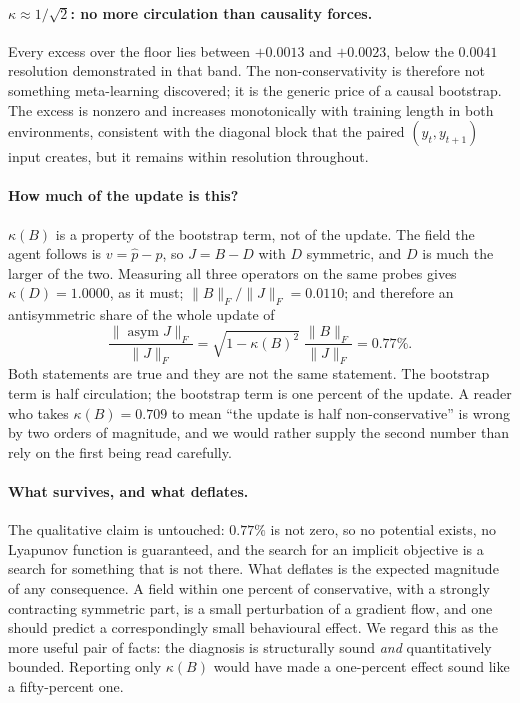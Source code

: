 \documentclass[11pt]{article}
\theoremstyle{remark}
\newcommand{\asym}{\operatorname{asym}}
\begin{document}
\paragraph{$\kappa \approx 1/\sqrt2$: no more circulation than causality forces.}
Every excess over the floor lies between $+0.0013$ and $+0.0023$, below the
$0.0041$ resolution demonstrated in that band. The non-conservativity is
therefore not something meta-learning discovered; it is the generic price of a
causal bootstrap. The excess is nonzero and increases monotonically with training
length in both environments, consistent with the diagonal block that the paired
$(y_t, y_{t+1})$ input creates, but it remains within resolution throughout.

\paragraph{How much of the update is this?} $\kappa(B)$ is a property of the
bootstrap term, not of the update. The field the agent follows is
$v = \hat p - p$, so $J = B - D$ with $D$ symmetric, and $D$ is much the larger
of the two. Measuring all three operators on the same probes gives
$\kappa(D) = 1.0000$, as it must; $\lVert B\rVert_F / \lVert J \rVert_F =
0.0110$; and therefore an antisymmetric share of the whole update of
\begin{equation}
  \frac{\lVert \asym J\rVert_F}{\lVert J \rVert_F}
  = \sqrt{1 - \kappa(B)^2}\;\frac{\lVert B\rVert_F}{\lVert J\rVert_F}
  = 0.77\%.
\end{equation}
Both statements are true and they are not the same statement. The bootstrap term
is half circulation; the bootstrap term is one percent of the update. A reader
who takes $\kappa(B) = 0.709$ to mean ``the update is half non-conservative'' is
wrong by two orders of magnitude, and we would rather supply the second number
than rely on the first being read carefully.

\paragraph{What survives, and what deflates.} The qualitative claim is
untouched: $0.77\%$ is not zero, so no potential exists, no Lyapunov function is
guaranteed, and the search for an implicit objective is a search for something
that is not there. What deflates is the expected magnitude of any consequence.
A field within one percent of conservative, with a strongly contracting
symmetric part, is a small perturbation of a gradient flow, and one should
predict a correspondingly small behavioural effect. We regard this as the more
useful pair of facts: the diagnosis is structurally sound \emph{and}
quantitatively bounded. Reporting only $\kappa(B)$ would have made a
one-percent effect sound like a fifty-percent one.
\end{document}
